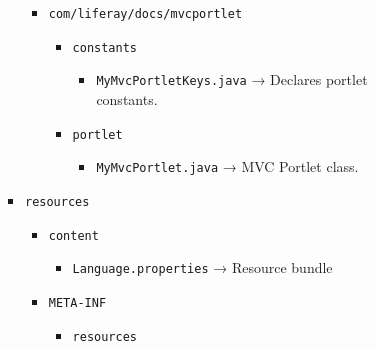 \begin{enumerate}
\begin{itemize}
\begin{itemize}
\begin{itemize}
\begin{itemize}
          \begin{itemize}
          \tightlist
          \item
            \texttt{com/liferay/docs/mvcportlet}

            \begin{itemize}
            \tightlist
            \item
              \texttt{constants}

              \begin{itemize}
              \tightlist
              \item
                \texttt{MyMvcPortletKeys.java} → Declares portlet
                constants.
              \end{itemize}
            \item
              \texttt{portlet}

              \begin{itemize}
              \tightlist
              \item
                \texttt{MyMvcPortlet.java} → MVC Portlet class.
              \end{itemize}
            \end{itemize}
          \end{itemize}
        \item
          \texttt{resources}

          \begin{itemize}
          \tightlist
          \item
            \texttt{content}

            \begin{itemize}
            \tightlist
            \item
              \texttt{Language.properties} → Resource bundle
            \end{itemize}
          \item
            \texttt{META-INF}

            \begin{itemize}
            \tightlist
            \item
              \texttt{resources}


\end{itemize}
\end{itemize}
\end{itemize}
\end{itemize}
\end{itemize}
\end{itemize}
\end{enumerate}
